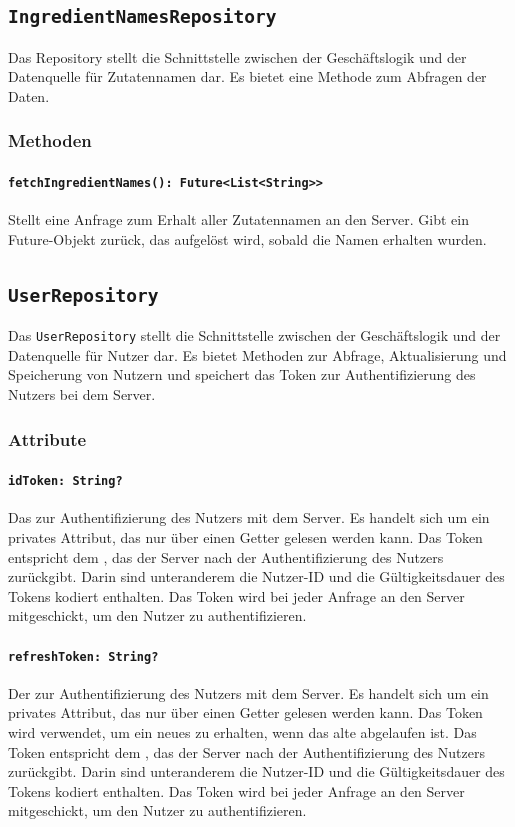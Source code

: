 \documentclass{entwurfsheft}
\begin{document}
\begin{sloppypar}
\subsection{\texttt{IngredientNamesRepository}}
\label{sec:ingredientNamesRepository}
Das Repository stellt die Schnittstelle zwischen der Geschäftslogik und der Datenquelle für Zutatennamen dar. Es bietet eine Methode zum Abfragen der Daten.
\subsubsection*{Methoden}
\paragraph{\texttt{fetchIngredientNames(): Future<List<String>>}}
Stellt eine Anfrage zum Erhalt aller Zutatennamen an den Server. Gibt ein Future-Objekt zurück, das aufgelöst wird, sobald die Namen erhalten wurden.
\newpage

\subsection{\texttt{UserRepository}}
\label{sec:userRepository}
Das \texttt{UserRepository} stellt die Schnittstelle zwischen der Geschäftslogik und der Datenquelle für Nutzer dar. Es bietet Methoden zur Abfrage, Aktualisierung und Speicherung von Nutzern und speichert das Token zur Authentifizierung des Nutzers bei dem Server.
\subsubsection*{Attribute}
\paragraph{\texttt{idToken: String?}}
Das  zur Authentifizierung des Nutzers mit dem Server. Es handelt sich um ein privates Attribut, das nur über einen Getter gelesen werden kann. Das Token entspricht dem , das der Server nach der Authentifizierung des Nutzers zurückgibt. Darin sind unteranderem die Nutzer-ID und die Gültigkeitsdauer des Tokens kodiert enthalten. Das Token wird bei jeder Anfrage an den Server mitgeschickt, um den Nutzer zu authentifizieren.

\paragraph{\texttt{refreshToken: String?}}
Der  zur Authentifizierung des Nutzers mit dem Server. Es handelt sich um ein privates Attribut, das nur über einen Getter gelesen werden kann. Das Token wird verwendet, um ein neues  zu erhalten, wenn das alte abgelaufen ist. Das Token entspricht dem , das der Server nach der Authentifizierung des Nutzers zurückgibt. Darin sind unteranderem die Nutzer-ID und die Gültigkeitsdauer des Tokens kodiert enthalten. Das Token wird bei jeder Anfrage an den Server mitgeschickt, um den Nutzer zu authentifizieren.


\end{sloppypar}
\end{document}
